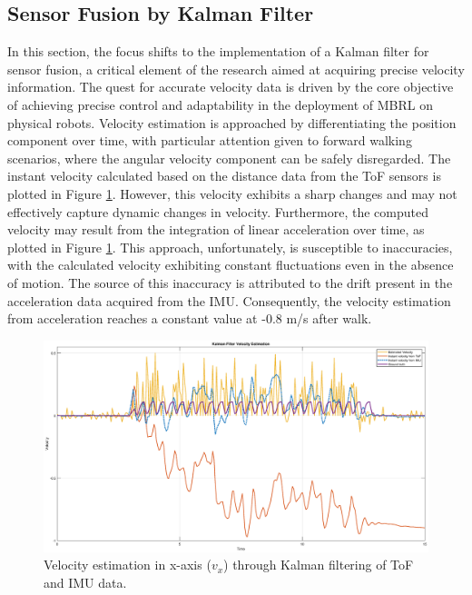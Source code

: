 \subsection{Sensor Fusion by Kalman Filter}
In this section, the focus shifts to the implementation of a Kalman filter for sensor fusion, a critical element of the research aimed at acquiring precise velocity information. The quest for accurate velocity data is driven by the core objective of achieving precise control and adaptability in the deployment of MBRL on physical robots. Velocity estimation is approached by differentiating the position component over time, with particular attention given to forward walking scenarios, where the angular velocity component can be safely disregarded. The instant velocity calculated based on the distance data from the ToF sensors is plotted in Figure \ref{fig:KF}. However, this velocity exhibits a sharp changes and may not effectively capture dynamic changes in velocity. Furthermore, the computed velocity may result from the integration of linear acceleration over time, as plotted in Figure \ref{fig:KF}. This approach, unfortunately, is susceptible to inaccuracies, with the calculated velocity exhibiting constant fluctuations even in the absence of motion. The source of this inaccuracy is attributed to the drift present in the acceleration data acquired from the IMU. Consequently, the velocity estimation from acceleration reaches a constant value at -0.8 m/s after walk. 
\begin{figure}[htb]
    \centering
    \includegraphics[width=\linewidth]{img/chap4/KF.eps}
    \caption{Velocity estimation in x-axis ($v_x$) through Kalman filtering of ToF and IMU data.}
    \label{fig:KF}
\end{figure}

